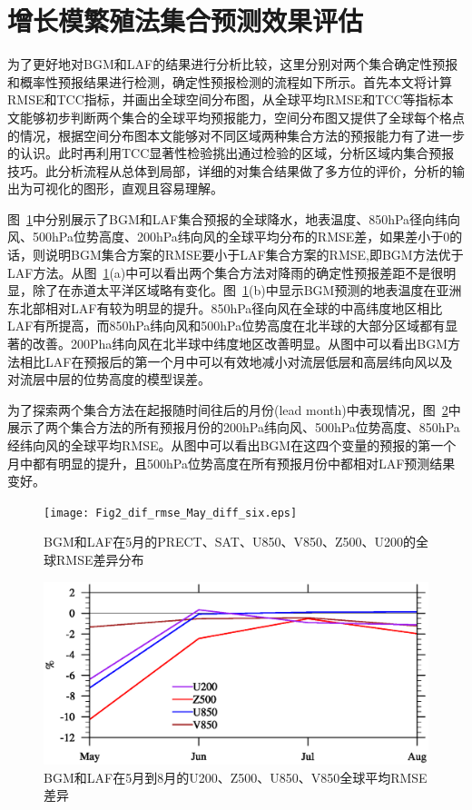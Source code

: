 \section{增长模繁殖法集合预测效果评估}
为了更好地对BGM和LAF的结果进行分析比较，这里分别对两个集合确定性预报和概率性预报结果进行检测，确定性预报检测的流程如下所示。首先本文将计算RMSE和TCC指标，并画出全球空间分布图，从全球平均RMSE和TCC等指标本文能够初步判断两个集合的全球平均预报能力，空间分布图又提供了全球每个格点的情况，根据空间分布图本文能够对不同区域两种集合方法的预报能力有了进一步的认识。此时再利用TCC显著性检验挑出通过检验的区域，分析区域内集合预报技巧。此分析流程从总体到局部，详细的对集合结果做了多方位的评价，分析的输出为可视化的图形，直观且容易理解。

图~\ref{fig:global rmse}中分别展示了BGM和LAF集合预报的全球降水，地表温度、850hPa径向纬向风、500hPa位势高度、200hPa纬向风的全球平均分布的RMSE差，如果差小于0的话，则说明BGM集合方案的RMSE要小于LAF集合方案的RMSE,即BGM方法优于LAF方法。从图~\ref{fig:global rmse}(a)中可以看出两个集合方法对降雨的确定性预报差距不是很明显，除了在赤道太平洋区域略有变化。图~\ref{fig:global rmse}(b)中显示BGM预测的地表温度在亚洲东北部相对LAF有较为明显的提升。850hPa径向风在全球的中高纬度地区相比LAF有所提高，而850hPa纬向风和500hPa位势高度在北半球的大部分区域都有显著的改善。200Pha纬向风在北半球中纬度地区改善明显。从图中可以看出BGM方法相比LAF在预报后的第一个月中可以有效地减小对流层低层和高层纬向风以及对流层中层的位势高度的模型误差。

为了探索两个集合方法在起报随时间往后的月份(lead month)中表现情况，图~\ref{fig:global rmse lead time}中展示了两个集合方法的所有预报月份的200hPa纬向风、500hPa位势高度、850hPa经纬向风的全球平均RMSE。从图中可以看出BGM在这四个变量的预报的第一个月中都有明显的提升，且500hPa位势高度在所有预报月份中都相对LAF预测结果变好。

\begin{figure}[H] %
  \centering
  \texttt{[image: Fig2\_dif\_rmse\_May\_diff\_six.eps]}
  \caption{BGM和LAF在5月的PRECT、SAT、U850、V850、Z500、U200的全球RMSE差异分布}
  \label{fig:global rmse}
\end{figure}

\begin{figure}[H] %
  \centering
  \includegraphics[scale=0.45,trim=1 110 1 150,clip]{figures/Fig3_dif_rmse_May_Aug_series.eps}
  \caption{BGM和LAF在5月到8月的U200、Z500、U850、V850全球平均RMSE差异}
  \label{fig:global rmse lead time}
\end{figure}

